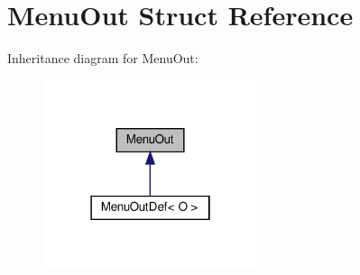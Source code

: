 \hypertarget{structMenuOut}{}\section{Menu\+Out Struct Reference}
\label{structMenuOut}


Inheritance diagram for Menu\+Out\+:\nopagebreak
\begin{figure}[H]
\begin{center}
\leavevmode
\includegraphics[width=178pt]{structMenuOut__inherit__graph}
\end{center}
\end{figure}
